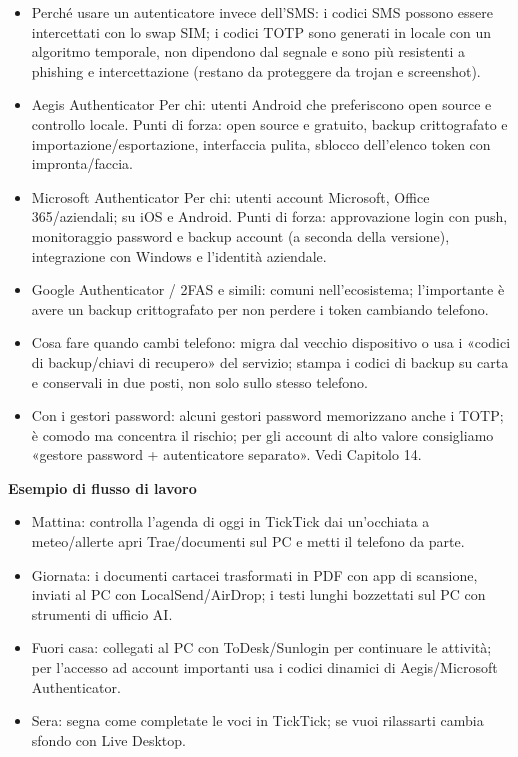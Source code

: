 \begin{itemize}
  \item Perché usare un autenticatore invece dell'SMS: i codici SMS possono essere intercettati con lo swap SIM; i codici TOTP sono generati in locale con un algoritmo temporale, non dipendono dal segnale e sono più resistenti a phishing e intercettazione (restano da proteggere da trojan e screenshot).
  \item Aegis Authenticator Per chi: utenti Android che preferiscono open source e controllo locale. Punti di forza: open source e gratuito, backup crittografato e importazione/esportazione, interfaccia pulita, sblocco dell'elenco token con impronta/faccia.
  \item Microsoft Authenticator Per chi: utenti account Microsoft, Office 365/aziendali; su iOS e Android. Punti di forza: approvazione login con push, monitoraggio password e backup account (a seconda della versione), integrazione con Windows e l'identità aziendale.
  \item Google Authenticator / 2FAS e simili: comuni nell'ecosistema; l'importante è avere un backup crittografato per non perdere i token cambiando telefono.
  \item Cosa fare quando cambi telefono: migra dal vecchio dispositivo o usa i «codici di backup/chiavi di recupero» del servizio; stampa i codici di backup su carta e conservali in due posti, non solo sullo stesso telefono.
  \item Con i gestori password: alcuni gestori password memorizzano anche i TOTP; è comodo ma concentra il rischio; per gli account di alto valore consigliamo «gestore password + autenticatore separato». Vedi Capitolo 14.
\end{itemize}


\textbf{Esempio di flusso di lavoro}\par

\begin{itemize}
  \item Mattina: controlla l'agenda di oggi in TickTick dai un'occhiata a meteo/allerte apri Trae/documenti sul PC e metti il telefono da parte.
  \item Giornata: i documenti cartacei trasformati in PDF con app di scansione, inviati al PC con LocalSend/AirDrop; i testi lunghi bozzettati sul PC con strumenti di ufficio AI.
  \item Fuori casa: collegati al PC con ToDesk/Sunlogin per continuare le attività; per l'accesso ad account importanti usa i codici dinamici di Aegis/Microsoft Authenticator.
  \item Sera: segna come completate le voci in TickTick; se vuoi rilassarti cambia sfondo con Live Desktop.
\end{itemize}

